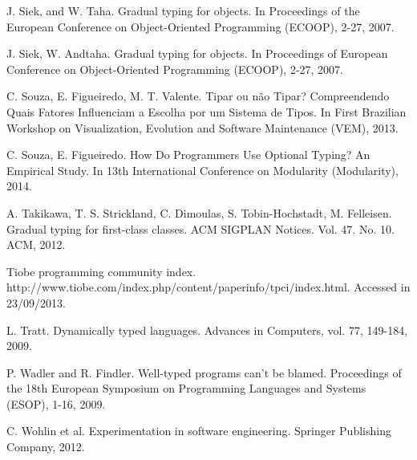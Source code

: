\documentclass[msc]{ppgccufmg}
\begin{document}
\begin{thebibliography}{}
J. Siek, and W. Taha. Gradual typing for objects. In Proceedings of the European Conference on Object-Oriented Programming (ECOOP),  2-27, 2007.

J. Siek, W. Andtaha. Gradual typing for objects. In Proceedings of European Conference on Object-Oriented Programming (ECOOP), 2-27, 2007.

C. Souza, E. Figueiredo, M. T. Valente. Tipar ou não Tipar? Compreendendo Quais Fatores Influenciam a Escolha por um Sistema de Tipos. In First Brazilian Workshop on Visualization, Evolution and Software Maintenance (VEM), 2013. 

C. Souza, E. Figueiredo. How Do Programmers Use Optional Typing? An Empirical Study. In 13th International Conference on Modularity (Modularity), 2014.

A. Takikawa, T. S. Strickland, C. Dimoulas, S. Tobin-Hochstadt, M. Felleisen. Gradual typing for first-class classes. ACM SIGPLAN Notices. Vol. 47. No. 10. ACM, 2012.

Tiobe programming community index. http://www.tiobe.com/index.php/content/paperinfo/tpci/index.html. Accessed in 23/09/2013.

L. Tratt. Dynamically typed languages. Advances in Computers, vol. 77, 149-184, 2009.

P. Wadler and R. Findler. Well-typed programs can't be blamed. Proceedings of the 18th European Symposium on Programming Languages and Systems (ESOP), 1-16, 2009.

C. Wohlin et al. Experimentation in software engineering. Springer Publishing Company, 2012.

\end{thebibliography}


\begin{appendices}


\end{appendices}


\begin{attachments}




\end{attachments}
\end{document}
